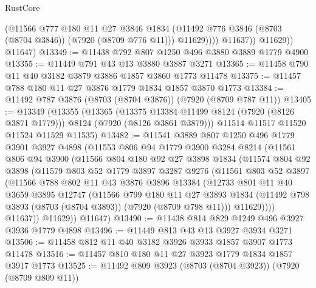 \begin{lexlean}{RustCore}
\begin{coremodule}
                    (@11566
                      @777
                      @180
                      @11
                      @27
                      @3846
                      @1834
                      (@11492 @776 @3846 (@8703 (@8704 @3846)) (@7920 (@8709 @776 @11)))
                      @11629))))
              @11637))
          @11629))
      @11647)
@13349 := @11438 @792 @807 @1250 @496 @3880 @3889 @1779 @4900
@13355 := @11449 @791 @43 @13 @3880 @3887 @3271
@13365 := @11458 @790 @11 @40 @3182 @3879 @3886 @1857 @3860 @1773 @11478
@13375 := @11457 @788 @180 @11 @27 @3876 @1779 @1834 @1857 @3870 @1773
@13384 := @11492 @787 @3876 (@8703 (@8704 @3876)) (@7920 (@8709 @787 @11))
@13405 := @13349
    (@13355
      (@13365
        (@13375 @13384 @11499 @8124 (@7920 (@8126 @3871 @1779)))
        @8124
        (@7920 (@8126 @3861 @3879)))
      @11514
      @11517
      @11520
      @11524
      @11529
      @11535)
@13482 := @11541
    @3889
    @807
    @1250
    @496
    @1779
    @3901
    @3927
    @4898
    (@11553
      @806
      @94
      @1779
      @3900
      @3284
      @8214
      (@11561
        @806
        @94
        @3900
        (@11566
          @804
          @180
          @92
          @27
          @3898
          @1834
          (@11574
            @804
            @92
            @3898
            (@11579
              @803
              @52
              @1779
              @3897
              @3287
              @9276
              (@11561
                @803
                @52
                @3897
                (@11566
                  @788
                  @802
                  @11
                  @43
                  @3876
                  @3896
                  @13384
                  (@12733
                    @801
                    @11
                    @40
                    @3659
                    @3895
                    @12747
                    (@11566
                      @799
                      @180
                      @11
                      @27
                      @3893
                      @1834
                      (@11492 @798 @3893 (@8703 (@8704 @3893)) (@7920 (@8709 @798 @11)))
                      @11629))))
              @11637))
          @11629))
      @11647)
@13490 := @11438 @814 @829 @1249 @496 @3927 @3936 @1779 @4898
@13496 := @11449 @813 @43 @13 @3927 @3934 @3271
@13506 := @11458 @812 @11 @40 @3182 @3926 @3933 @1857 @3907 @1773 @11478
@13516 := @11457 @810 @180 @11 @27 @3923 @1779 @1834 @1857 @3917 @1773
@13525 := @11492 @809 @3923 (@8703 (@8704 @3923)) (@7920 (@8709 @809 @11))

\end{coremodule}
\end{lexlean}
